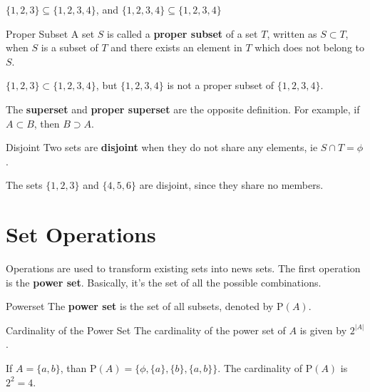\begin{boxexample}{}{}
	$\{1,2,3\} \subseteq \{1,2,3,4\}$, and $\{1,2,3,4\} \subseteq \{1,2,3,4\}$
\end{boxexample}

\begin{boxdefine}{Proper Subset}{}
	A set $S$ is called a {\bf proper subset} of a set $T$, written as $S \subset T$, when $S$ is a subset of $T$ and there exists an element in $T$ which does not belong to $S$.
\end{boxdefine}

\begin{boxexample}{}{}
	$\{1,2,3\} \subset \{1,2,3,4\}$, but $\{1,2,3,4\}$ is not a proper subset of $\{1,2,3,4\}$.
\end{boxexample}

The {\bf superset} and {\bf proper superset} are the opposite definition. For example, if $A \subset B$, then $B \supset A$.

\begin{boxdefine}{Disjoint}{}
	Two sets are {\bf disjoint} when they do not share any elements, ie $S \cap T=\phi$.
\end{boxdefine}

\begin{boxexample}{}{}
	The sets $\{1,2,3\}$ and $\{4,5,6\}$ are disjoint, since they share no members.
\end{boxexample}

\section{Set Operations}

Operations are used to transform existing sets into news sets.  The first operation is the {\bf power set}. Basically, it's the set of all the possible combinations.

\begin{boxdefine}{Powerset}{}
	The {\bf power set} is the set of all subsets, denoted by $\text{P}(A)$.
\end{boxdefine}

\begin{boxproposition}{Cardinality of the Power Set}{}
	The cardinality of the power set of $A$ is given by $2^{|A|}$.
\end{boxproposition}

\begin{boxexample}{}{}
	If $A=\{a,b\}$, than $\text{P}(A) = \{\phi,\{a\},\{b\},\{a,b\}\}$. The cardinality of $\text{P}(A)$ is $2^{2}=4$.
\end{boxexample}


